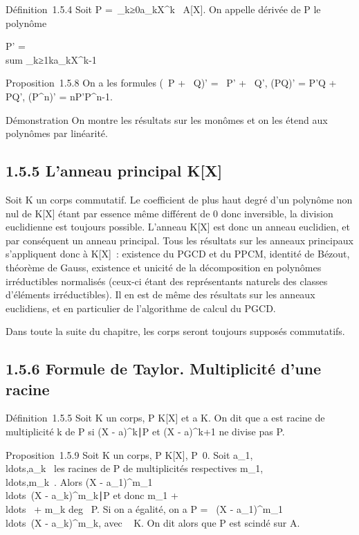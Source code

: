Définition~1.5.4 Soit P =\
\sum  _k≥0a_kX^k~ \in
A[X]. On appelle dérivée de P le polynôme

P' = \\sum
_k≥1ka_kX^k-1

Proposition~1.5.8 On a les formules (\alpha~P + \beta~Q)' = \alpha~P' + \beta~Q', (PQ)' = P'Q
+ PQ', (P^n)' = nP'P^n-1.

Démonstration On montre les résultats sur les monômes et on les étend
aux polynômes par linéarité.

\subsection{1.5.5 L'anneau principal K[X]}

Soit K un corps commutatif. Le coefficient de plus haut degré d'un
polynôme non nul de K[X] étant par essence même différent de 0 donc
inversible, la division euclidienne est toujours possible. L'anneau
K[X] est donc un anneau euclidien, et par conséquent un anneau
principal. Tous les résultats sur les anneaux principaux s'appliquent
donc à K[X]~: existence du PGCD et du PPCM, identité de Bézout,
théorème de Gauss, existence et unicité de la décomposition en polynômes
irréductibles normalisés (ceux-ci étant des représentants naturels des
classes d'éléments irréductibles). Il en est de même des résultats sur
les anneaux euclidiens, et en particulier de l'algorithme de calcul du
PGCD.

Dans toute la suite du chapitre, les corps seront toujours supposés
commutatifs.

\subsection{1.5.6 Formule de Taylor. Multiplicité d'une racine}

Définition~1.5.5 Soit K un corps, P \in K[X] et a \in K. On dit que a
est racine de multiplicité k de P si (X -
a)^k∣P et (X - a)^k+1 ne
divise pas P.

Proposition~1.5.9 Soit K un corps, P \in K[X],
P\neq~0. Soit
a_1,\\ldots,a_k~
les racines de P de multiplicités respectives
m_1,\\ldots,m_k~.
Alors (X -
a_1)^m_1\\ldots~(X
- a_k)^m_k∣P et
donc m_1 +
\\ldots~ +
m_k \leq deg~ P. Si on a égalité, on a P
= \lambda~(X -
a_1)^m_1\\ldots~(X
- a_k)^m_k, avec \lambda~ \in K. On dit alors que P
est scindé sur A.

